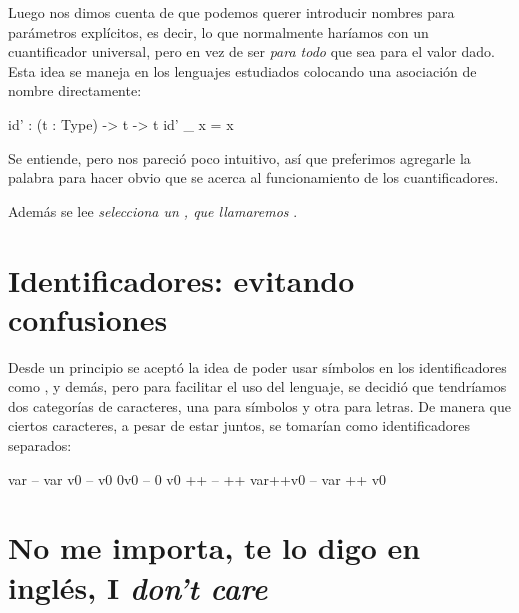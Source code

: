 \begin{blueleft}
Luego nos dimos cuenta de que podemos querer introducir nombres para parámetros explícitos, es decir, lo que normalmente haríamos con un cuantificador universal, pero en vez de ser \emph{para todo} que sea para el valor dado. Esta idea se maneja en los lenguajes estudiados colocando una asociación de nombre directamente:

\begin{anglercode}
id' : (t : Type) -> t -> t
id' _ x = x
\end{anglercode}

Se entiende, pero nos pareció poco intuitivo, así que preferimos agregarle la palabra  para hacer obvio que se acerca al funcionamiento de los cuantificadores.

Además se lee \emph{\guillemotleft selecciona un , que llamaremos \guillemotright}.
\end{blueleft}

\section{Identificadores: evitando confusiones}

\begin{blueleft}
Desde un principio se aceptó la idea de poder usar símbolos en los identificadores como \inlinecode{+}, \inlinecode{*} y demás, pero para facilitar el uso del lenguaje, se decidió que tendríamos dos categorías de caracteres, una para símbolos y otra para letras. De manera que ciertos caracteres, a pesar de estar juntos, se tomarían como identificadores separados:

\begin{anglercode}
var         -- var
v0          -- v0
0v0         -- 0 v0
++          -- ++
var++v0     -- var ++ v0
\end{anglercode}
\end{blueleft}

\section{No me importa, te lo digo en inglés, I \emph{don't care}}

